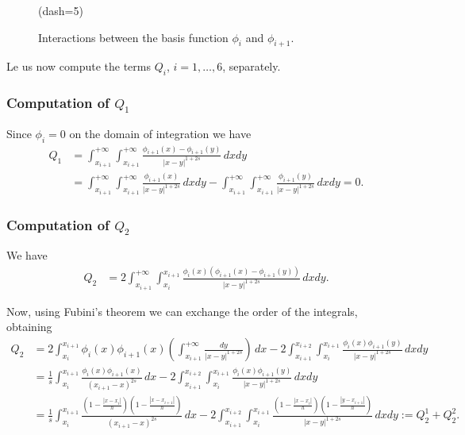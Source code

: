 {\begin{figure}[h]
\figdrawline[33,30]
\figdrawline[31,45]
\figdrawline[38,35]
\figdrawline[40,37]
\figdrawline[33,39]
\figdrawline[31,38]
\figdrawline[30,37]
\figdrawline[43,35]
\figset(dash=5)
\figdrawline[47,48]
\figdrawend

\centerline{\box\figBoxA}
\caption{Interactions between the basis function $\phi_i$ and $\phi_{i+1}$.}\label{upp_dia}
\end{figure}

Le us now compute the terms $Q_i$, $i=1,\ldots,6$, separately. 
\subsubsection*{Computation of $Q_1$}
Since $\phi_i = 0$ on the domain of integration we have
\begin{align*}
	Q_1 &= \int_{x_{i+1}}^{+\infty}\int_{x_{i+1}}^{+\infty} \frac{\phi_{i+1}(x)-\phi_{i+1}(y)}{|x-y|^{1+2s}}\,dxdy 
	\\
	&= \int_{x_{i+1}}^{+\infty}\int_{x_{i+1}}^{+\infty} \frac{\phi_{i+1}(x)}{|x-y|^{1+2s}}\,dxdy - \int_{x_{i+1}}^{+\infty}\int_{x_{i+1}}^{+\infty} \frac{\phi_{i+1}(y)}{|x-y|^{1+2s}}\,dxdy = 0.
\end{align*}

\subsubsection*{Computation of $Q_2$}
We have
\begin{align*}
	Q_2 &= 2\int_{x_{i+1}}^{+\infty}\int_{x_i}^{x_{i+1}} \frac{\phi_i(x)(\phi_{i+1}(x)-\phi_{i+1}(y))}{|x-y|^{1+2s}}\,dxdy. 
\end{align*}

Now, using Fubini's theorem we can exchange the order of the integrals, obtaining 
\begin{align*}
	Q_2 &= 2\int_{x_i}^{x_{i+1}}\phi_i(x)\phi_{i+1}(x)\left(\int_{x_{i+1}}^{+\infty} \frac{dy}{|x-y|^{1+2s}}\right)\,dx - 2\int_{x_{i+1}}^{x_{i+2}}\int_{x_i}^{x_{i+1}} \frac{\phi_i(x)\phi_{i+1}(y)}{|x-y|^{1+2s}}\,dxdy 
	\\
	&= \frac{1}{s}\int_{x_i}^{x_{i+1}}\frac{\phi_i(x)\phi_{i+1}(x)}{(x_{i+1}-x)^{2s}}\,dx - 2\int_{x_{i+1}}^{x_{i+2}}\int_{x_i}^{x_{i+1}} \frac{\phi_i(x)\phi_{i+1}(y)}{|x-y|^{1+2s}}\,dxdy
	\\
	&= \frac{1}{s}\int_{x_i}^{x_{i+1}}\frac{\left(1-\frac{|x-x_i|}{h}\right)\left(1-\frac{|x-x_{i+1}|}{h}\right)}{(x_{i+1}-x)^{2s}}\,dx - 2\int_{x_{i+1}}^{x_{i+2}}\int_{x_i}^{x_{i+1}} \frac{\left(1-\frac{|x-x_i|}{h}\right)\left(1-\frac{|y-x_{i+1}|}{h}\right)}{|x-y|^{1+2s}}\,dxdy:= Q_2^1 + Q_2^2.
\end{align*}

}
